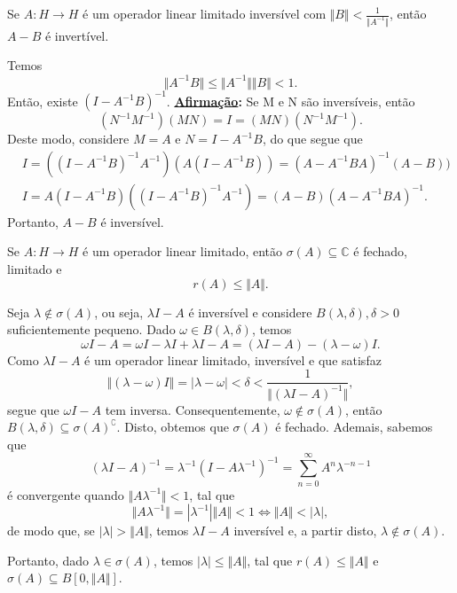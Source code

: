 \documentclass[measure_theory.tex]{subfiles}
\begin{document}
\begin{prop*}
	Se \(A:H\rightarrow H\) é um operador linear limitado inversível com \(\Vert B \Vert < \frac{1}{\Vert A^{-1} \Vert}\), então \(A - B\) é invertível.
\end{prop*}
\begin{proof*}
	Temos
	\[
		\Vert A^{-1}B \Vert \leq \Vert A^{-1} \Vert \Vert B \Vert < 1.
	\]
	Então, existe \((I-A^{-1}B)^{-1}\).
	\textbf{\underline{Afirmação}:} Se M e N são inversíveis, então
	\[
		(N^{-1}M^{-1})(MN) = I = (MN)(N^{-1}M^{-1}).
	\]
	Deste modo, considere \(M = A\) e \(N = I - A^{-1}B\), do que segue que
	\begin{align*}
		 & I = ((I-A^{-1}B)^{-1}A^{-1})(A(I-A^{-1}B)) = (A-A^{-1}BA)^{-1}(A-B)) \\
		 & I = A(I-A^{-1}B)((I-A^{-1}B)^{-1}A^{-1}) = (A-B)(A-A^{-1}BA)^{-1}.
	\end{align*}
	Portanto, \(A- B\) é inversível. \qedsymbol
\end{proof*}
\begin{prop*}
	Se \(A:H\rightarrow H\) é um operador linear limitado, então \(\sigma (A)\subseteq \mathbb{C}\) é fechado, limitado e
	\[
		r(A) \leq \Vert A \Vert.
	\]
\end{prop*}
\begin{proof*}
	Seja \(\lambda \not\in \sigma (A)\), ou seja, \(\lambda I - A\) é inversível e considere \(B(\lambda , \delta ), \delta > 0\) suficientemente pequeno. Dado \(\omega \in B(\lambda , \delta )\), temos
	\[
		\omega I - A = \omega I - \lambda I + \lambda I - A = (\lambda I - A) - (\lambda -\omega )I.
	\]
	Como \(\lambda I - A \) é um operador linear limitado, inversível e que satisfaz
	\[
		\Vert (\lambda - \omega )I \Vert = |\lambda  - \omega | < \delta  < \frac{1}{\Vert (\lambda I - A)^{-1} \Vert},
	\]
	segue que \(\omega I - A\) tem inversa. Consequentemente, \(\omega \not\in \sigma (A)\), então \(B(\lambda , \delta )\subseteq \sigma (A)^{\complement}\).
	Disto, obtemos que \(\sigma (A)\) é fechado. Ademais, sabemos que
	\[
		(\lambda I - A)^{-1} = \lambda ^{-1}(I-A\lambda ^{-1})^{-1} = \sum\limits_{n=0}^{\infty}A^{n}\lambda ^{-n-1}
	\]
	é convergente quando \(\Vert A\lambda ^{-1} \Vert < 1\), tal que
	\[
		\Vert A\lambda ^{-1} \Vert = |\lambda ^{-1}| \Vert A \Vert < 1 \Longleftrightarrow \Vert A \Vert < |\lambda |,
	\]
	de modo que, se \(|\lambda | > \Vert A \Vert\), temos \(\lambda I - A\) inversível e, a partir disto, \(\lambda \not\in \sigma (A)\).

	Portanto, dado \(\lambda \in \sigma (A)\), temos \(|\lambda |\leq \Vert A \Vert\), tal que \(r(A) \leq \Vert A \Vert\) e \(\sigma (A) \subseteq B[0, \Vert A \Vert]\). \qedsymbol
\end{proof*}
\end{document}
